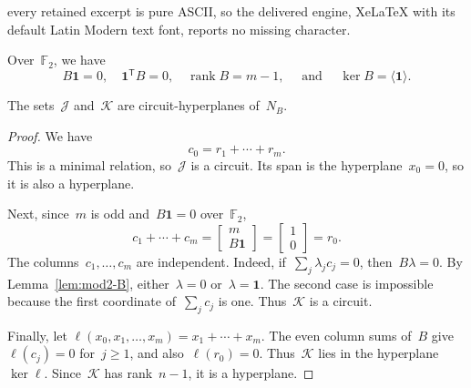 \documentclass[10pt,a4paper]{amsart}
\DeclareMathOperator{\rank}{rank}
\newcommand{\F}{\mathbb F}
\newcommand{\cJ}{\mathcal J}
\newcommand{\cK}{\mathcal K}
\newcommand{\one}{\mathbf 1}
\newcommand{\sfT}{\mathsf T}
\newcommand{\wideand}{ \quad \text{ and } \quad }
\begin{document}
every retained excerpt is pure ASCII, so the delivered engine, XeLaTeX with its default Latin Modern text font, reports no missing character.
\begin{lemma}\label{lem:mod2-B}
    Over~$\F_2$, we have
    $$
        B\one=0, \quad \one^{\sfT}B=0, \quad \rank B=m-1, \wideand \ker B=\langle\one\rangle.
    $$
\end{lemma}

\begin{lemma}\label{lem:two-CH}
    The sets~$\cJ$ and~$\cK$ are circuit-hyperplanes of~$N_B$.
\end{lemma}

\begin{proof}
    We have
    $$
    c_0=r_1+\cdots+r_m.
    $$
    This is a minimal relation, so~$\cJ$ is a circuit.
    Its span is the hyperplane~$x_0=0$, so it is also a hyperplane.
    
    Next, since~$m$ is odd and~$B\one=0$ over~$\F_2$,
    $$
        c_1+\cdots+c_m = \begin{bmatrix} m\\ B\one \end{bmatrix} = \begin{bmatrix} 1\\ 0 \end{bmatrix} =r_0.
    $$
    The columns~$c_1,\ldots,c_m$ are independent.
    Indeed, if~$\sum_j\lambda_jc_j=0$, then~$B\lambda=0$.
    By Lemma~\ref{lem:mod2-B}, either~$\lambda=0$ or~$\lambda=\one$.
    The second case is impossible because the first coordinate of~$\sum_jc_j$ is one.
    Thus~$\cK$ is a circuit.
    
    Finally, let $\ell(x_0,x_1,\ldots,x_m)=x_1+\cdots+x_m$.
    The even column sums of~$B$ give~$\ell(c_j)=0$ for~$j\geq1$, and also~$\ell(r_0)=0$.
    Thus~$\cK$ lies in the hyperplane~$\ker\ell$.
    Since~$\cK$ has rank~$n-1$, it is a hyperplane.
\end{proof}
\end{document}
